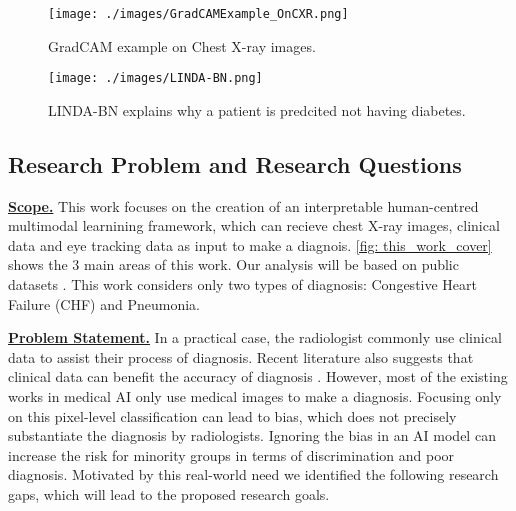 \begin{figure}[!h]
    \centering
    \texttt{[image: ./images/GradCAMExample\_OnCXR.png]}
    \caption{GradCAM example on Chest X-ray images. \citep{Teixeira2021LIMEAndGradCAMOnCXR}}
    \label{fig: GradCAMExample_OnCXR}
\end{figure}

\begin{figure}[!h]
    \centering
    \texttt{[image: ./images/LINDA-BN.png]}
    \caption{LINDA-BN explains why a patient is predcited not having diabetes. \citep{Moreira2021LINDA}}
    \label{fig: LINDA-BN_diabetes}
\end{figure}




\subsection{Research Problem and Research Questions}

\underline{\textbf{Scope.}} This work focuses on the creation of an interpretable human-centred multimodal learnining framework, which can recieve chest X-ray images, clinical data and eye tracking data as input to make a diagnois. \ref{fig: this_work_cover} shows the 3 main areas of this work. Our analysis will be based on public datasets \citep{Johnson2021MIMIC_IV, Johnson2019MIMIC_CXR, Johnson2021MIMIC_IV_ED, Lanfredi2021REFLACX, Karargyris2020EyeGazeDataset}. This work considers only two types of diagnosis: Congestive Heart Failure (CHF) and Pneumonia.

\noindent
\underline{\textbf{Problem Statement.}}
In a practical case, the radiologist commonly use clinical data to assist their process of diagnosis. Recent literature also suggests that clinical data can benefit the accuracy of diagnosis \citep{Castillo2020ClinicalInformationOnRadiology, Leslie2000CTClinicalData}. However, most of the existing works in medical AI only use medical images to make a diagnosis. Focusing only on this pixel-level classification can lead to bias, which does not precisely substantiate the diagnosis by radiologists. Ignoring the bias in an AI model can increase the risk for minority groups in terms of discrimination and poor diagnosis. Motivated by this real-world need we identified the following research gaps, which will lead to the proposed research goals.

